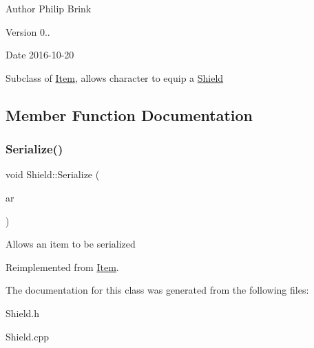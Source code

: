 \begin{DoxyAuthor}{Author}
Philip Brink 
\end{DoxyAuthor}
\begin{DoxyVersion}{Version}
0.. 
\end{DoxyVersion}
\begin{DoxyDate}{Date}
2016-\/10-\/20
\end{DoxyDate}
Subclass of \hyperlink{class_item}{Item}, allows character to equip a \hyperlink{class_shield}{Shield} 

\subsection{Member Function Documentation}
\hypertarget{class_shield_a8d045c43b16aab5fc474e696cb8a7f1f}{}\label{class_shield_a8d045c43b16aab5fc474e696cb8a7f1f} 
\subsubsection{\texorpdfstring{Serialize()}{Serialize()}}
{\footnotesize\ttfamily void Shield\+::\+Serialize (\begin{DoxyParamCaption}\item[{C\+Archive \&}]{ar }\end{DoxyParamCaption})\hspace{0.3cm}{\ttfamily [virtual]}}

Allows an item to be serialized 

Reimplemented from \hyperlink{class_item_ad1eae21e57fc3ce3252080a4efbfb8e8}{Item}.



The documentation for this class was generated from the following files\+:\begin{DoxyCompactItemize}
\item 
Shield.\+h\item 
Shield.\+cpp\end{DoxyCompactItemize}
